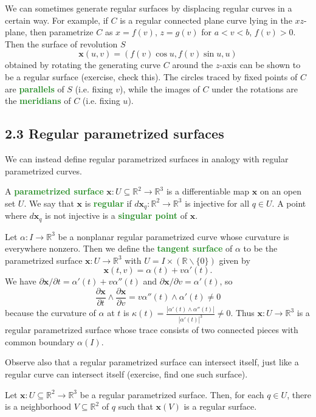 \documentclass[10pt]{scrartcl}
\providecommand{\RR}{\mathbb R}
\providecommand{\setdiff}{\smallsetminus}
\providecommand{\mb}[1]{\mathbf{#1}}
\providecommand{\vocab}[1]{{\textbf{\textcolor{ForestGreen}{#1}}}}
\begin{document}
We can sometimes generate regular surfaces by displacing regular curves
in a certain way. For example, if $C$ is a regular connected plane curve
lying in the $xz$-plane, then parametrize $C$ as
$x=f(v)$, $z=g(v)$ for $a<v<b$, $f(v)>0$. Then the surface of revolution $S$
\[\mb x(u,v) = (f(v)\cos u, f(v)\sin u, u)\]
obtained by rotating the generating curve $C$ around the $z$-axis can be shown
to be a regular surface (exercise, check this).
The circles traced by fixed points of $C$ are \vocab{parallels} of $S$
(i.e. fixing $v$), while the images of $C$ under the rotations
are the \vocab{meridians} of $C$ (i.e. fixing $u$).
\pagebreak
\subsection{2.3 Regular parametrized surfaces}
We can instead define regular parametrized surfaces
in analogy with regular parametrized curves.
\begin{definition}
	A \vocab{parametrized surface} $\mb x\colon U\subseteq\RR^2\to\RR^3$
	is a differentiable map $\mb x$ on an open set $U$.
	We say that $\mb x$ is \vocab{regular} if $d\mb x_q\colon\RR^2\to\RR^3$
	is injective for all $q\in U$.
	A point where $d\mb x_q$ is not injective is a
	\vocab{singular point} of $\mb x$.
\end{definition}

\begin{example}
	Let $\alpha\colon I\to\RR^3$ be a nonplanar regular parametrized curve
	whose curvature is everywhere nonzero. Then we define the
	\vocab{tangent surface} of $\alpha$ to be the parametrized surface
	$\mb x\colon U\to\RR^3$ with $U=I\times(\RR\setdiff\{0\})$ given by
	\[\mb x(t,v) = \alpha(t) + v\alpha'(t).\]
	We have $\partial\mb x/\partial t = \alpha'(t)+v\alpha''(t)$
	and $\partial\mb x/\partial v = \alpha'(t)$, so
	\[\frac{\partial\mb x}{\partial t}\wedge\frac{\partial \mb x}{\partial v}
	= v\alpha''(t)\wedge \alpha'(t)\ne 0\]
	because the curvature of $\alpha$ at $t$ is $\kappa(t) =
	\frac{|\alpha'(t)\wedge\alpha''(t)|}{|\alpha'(t)|^3}\ne 0$.
	Thus $\mb x\colon U\to\RR^3$ is a regular parametrized surface
	whose trace consists of two connected pieces
	with common boundary $\alpha(I)$.
\end{example}

Observe also that a regular parametrized surface can intersect itself,
just like a regular curve can intersect itself
(exercise, find one such surface).

\begin{prop}
	Let $\mb x\colon U\subseteq\RR^2\to\RR^3$ be a regular parametrized surface.
	Then, for each $q\in U$, there is a neighborhood $V\subseteq\RR^2$ of $q$
	such that $\mb x(V)$ is a regular surface.
\end{prop}
\end{document}
